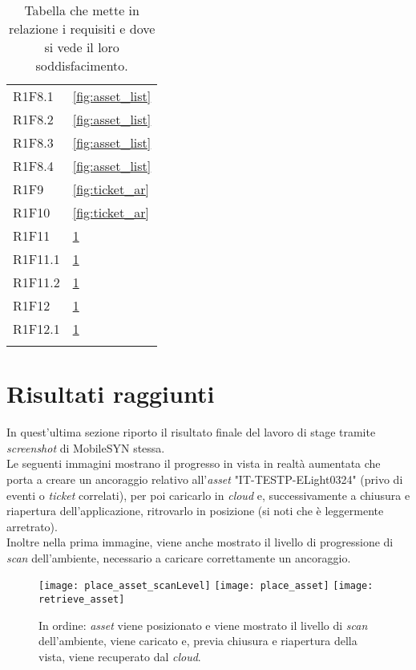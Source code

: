 {\begin{longtable}{C{.3\freewidth} C{.4\freewidth}}
    R1F8.1 & \ref{fig:asset_list}\\
    R1F8.2 & \ref{fig:asset_list}\\
    R1F8.3 &\ref{fig:asset_list}\\
    R1F8.4 & \ref{fig:asset_list}\\
    R1F9 & \ref{fig:ticket_ar}\\
    R1F10 &\ref{fig:ticket_ar}\\ 
    R1F11 &\ref{fig:place_asset} \\
    R1F11.1 & \ref{fig:place_asset}\\
    R1F11.2 & \ref{fig:place_asset}\\
    R1F12 & \ref{fig:place_asset}\\
    R1F12.1 & \ref{fig:place_asset}\\
    
    \bottomrule
    \caption[Tabella requisiti - chi li soddisfa]{Tabella che mette in relazione i requisiti e dove si vede il loro soddisfacimento.}
    \end{longtable}
}

\section{Risultati raggiunti}
In quest'ultima sezione riporto il risultato finale del lavoro di stage tramite \textit{screenshot} di MobileSYN stessa.\\
Le seguenti immagini mostrano il progresso in vista in realtà aumentata che porta a creare un ancoraggio relativo all'\textit{asset} "IT-TESTP-ELight0324" (privo di eventi o \textit{ticket} correlati), per poi caricarlo in \textit{cloud} e, successivamente a chiusura e riapertura dell'applicazione, ritrovarlo in posizione (si noti che è leggermente arretrato).\\
Inoltre nella prima immagine, viene anche mostrato il livello di progressione di \textit{scan} dell'ambiente, necessario a caricare correttamente un ancoraggio.

\begin{figure}[H]
  \centering
  \texttt{[image: place\_asset\_scanLevel]}\hfill
  \texttt{[image: place\_asset]}\hfill
  \texttt{[image: retrieve\_asset]}\hfill

  \caption[Creazione, caricamento e recupero di \textit{asset}]{In ordine: \textit{asset} viene posizionato e viene mostrato il livello di \textit{scan} dell'ambiente, viene caricato e, previa chiusura e riapertura della vista, viene recuperato dal \textit{cloud}.}
  \label{fig:place_asset}
\end{figure}

